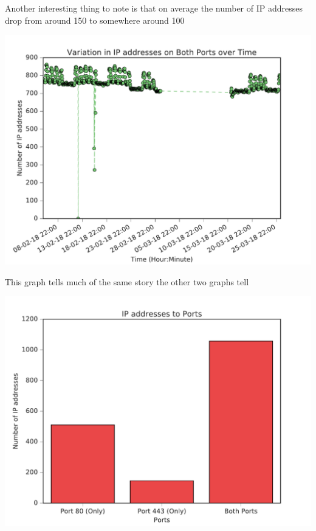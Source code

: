 \documentclass[a4wide,leqno,12pt]{report}
\begin{document}
Another interesting thing to note is that on average the number of IP addresses drop from around 150 to somewhere around 100 
\begin{center}
\includegraphics[scale=.5]{pdf_images/VariationInIpAddressesOnBothPortsOverTime}
\end{center}
This graph tells much of the same story the other two graphs tell


\begin{center}
\includegraphics[scale=.5]{pdf_images/IPaddressestoPorts}
\end{center}
\end{document}
